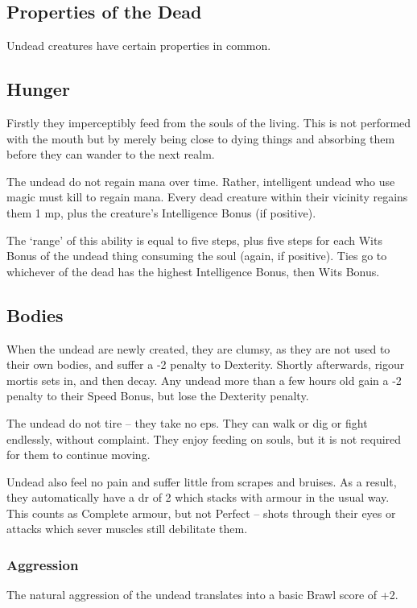 \begin{multicols}{2}

\subsection{Properties of the Dead}

\noindent
Undead creatures have certain properties in common.

\subsection{Hunger}
Firstly they imperceptibly feed from the souls of the living.
This is not performed with the mouth but by merely being close to dying things and absorbing them before they can wander to the next realm.

The undead do not regain mana over time.
Rather, intelligent undead who use magic must kill to regain mana.
Every dead creature within their vicinity regains them 1 \gls{mp}, plus the creature's Intelligence Bonus (if positive).

The `range' of this ability is equal to five steps, plus five steps for each Wits Bonus of the undead thing consuming the soul (again, if positive).
Ties go to whichever of the dead has the highest Intelligence Bonus, then Wits Bonus.

\subsection{Bodies}

When the undead are newly created, they are clumsy, as they are not used to their own bodies, and suffer a -2 penalty to Dexterity.
Shortly afterwards, rigour mortis sets in, and then decay.
Any undead more than a few hours old gain a -2 penalty to their Speed Bonus, but lose the Dexterity penalty.

The undead do not tire -- they take no \glspl{ep}.
They can walk or dig or fight endlessly, without complaint.
They enjoy feeding on souls, but it is not required for them to continue moving.

Undead also feel no pain and suffer little from scrapes and bruises.
As a result, they automatically have a \gls{dr} of 2 which stacks with armour in the usual way.%
This counts as Complete armour, but not Perfect -- shots through their eyes or attacks which sever muscles still debilitate them.

\subsubsection{Aggression}
The natural aggression of the undead translates into a basic Brawl score of +2.

\end{multicols}

